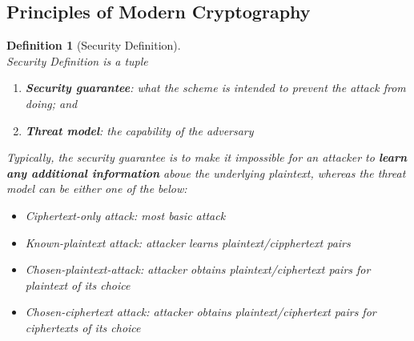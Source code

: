 \documentclass[12pt]{article}
\newtheorem{definition}{Definition}[section]
\theoremstyle{definition}
\begin{document}
\subsection{Principles of Modern Cryptography}
\begin{definition}[Security Definition]
\hfill\\\normalfont Security Definition is a tuple
\begin{enumerate}
  \item \textbf{Security guarantee}: what the scheme is intended to prevent the attack from doing; and
  \item \textbf{Threat model}: the capability of the adversary
\end{enumerate}
Typically, the security guarantee is to make it impossible for an attacker to \textbf{learn any additional information} aboue the underlying plaintext, whereas the threat model can be either one of the below:
\begin{itemize}
  \item Ciphertext-only attack: most basic attack
  \item Known-plaintext attack: attacker learns plaintext/cipphertext pairs
  \item Chosen-plaintext-attack: attacker obtains plaintext/ciphertext pairs for plaintext of its choice
  \item Chosen-ciphertext attack: attacker obtains plaintext/ciphertext pairs for ciphertexts of its choice
\end{itemize}
\end{definition}
\end{document}
